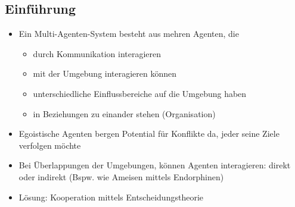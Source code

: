 \documentclass{article} %
\begin{document}
	\subsection{Einführung}
	\begin{itemize}
		\item Ein Multi-Agenten-System besteht aus mehren Agenten, die
		\begin{itemize}
			\item durch Kommunikation interagieren
			\item mit der Umgebung interagieren können
			\item unterschiedliche Einflussbereiche auf die Umgebung haben
			\item in Beziehungen zu einander stehen (Organisation)
		\end{itemize}
		\item Egoistische Agenten bergen Potential für Konflikte da, jeder seine Ziele verfolgen möchte
		\item Bei Überlappungen der Umgebungen, können Agenten interagieren: direkt oder indirekt (Bspw. wie Ameisen mittels Endorphinen)
		\item Lösung: Kooperation mittels Entscheidungstheorie
	\end{itemize}
\end{document}
